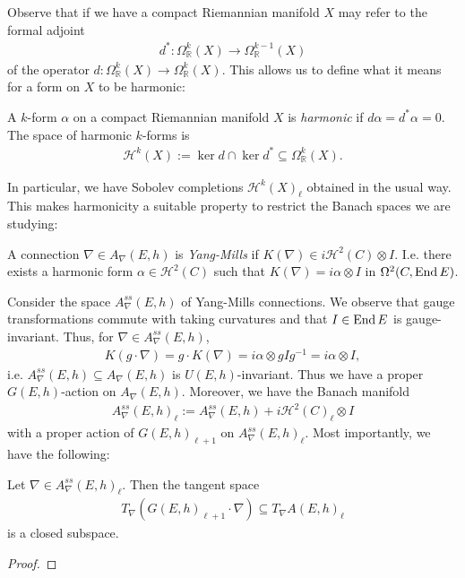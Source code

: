 \documentclass[12pt]{ociamthesis}  %
\begin{document}
Observe that if we have a compact Riemannian manifold $X$ may refer to the
formal adjoint 
\begin{align*}
  d^* : \Omega^k_{\mathbb{R}}(X)\to \Omega^{k-1}_{\mathbb{R}}(X)
\end{align*}
of the operator $d : \Omega^k_{\mathbb{R}}(X)\to\Omega^k_{\mathbb{R}}(X)$. This allows us to
define what it means for a form on $X$ to be harmonic:

\begin{definition}
  A $k$-form $\alpha$ on a compact Riemannian manifold $X$ is \emph{harmonic} if
  $d \alpha = d^* \alpha = 0$. The space of harmonic $k$-forms is
  \begin{align*}
    \mathcal H^k(X) := \ker d \cap \ker d^* \subseteq \Omega^k_{\mathbb{R}}(X).
  \end{align*}
\end{definition}

In particular, we have Sobolev completions $\mathcal H^k(X)_\ell$
obtained in the usual way. This makes harmonicity a suitable property to
restrict the Banach spaces we are studying:

\begin{definition}
  A connection $\nabla\in A_\nabla(E,h)$ is \emph{Yang-Mills} if
  $K(\nabla) \in i\mathcal H^2(C)\otimes I$. I.e. there exists a harmonic form
  $\alpha\in\mathcal H^2(C)$ such that $K(\nabla) = i\alpha\otimes I$ in
  $\Omega^2(C,\operatorname{End} E)$.
\end{definition}

Consider the space $A_\nabla^{ss}(E,h)$ of Yang-Mills connections.
We observe that gauge transformations commute with taking curvatures and
that $I\in\operatorname{End} E$ is gauge-invariant. Thus, for $\nabla\in A_\nabla^{ss}(E,h)$,
\begin{align*}
  K(g\cdot\nabla)
  = g\cdot K(\nabla)
  = i\alpha\otimes gIg^{-1}
  = i\alpha\otimes I,
\end{align*}
i.e. $A_\nabla^{ss}(E,h)\subseteq A_\nabla(E,h)$ is $U(E,h)$-invariant.
Thus we have a proper $G(E,h)$-action on $A_\nabla(E,h)$. Moreover,
we have the Banach manifold
\begin{align*}
  A^{ss}_{\nabla}(E,h)_\ell := A^{ss}_\nabla(E,h) + i\mathcal H^2(C)_\ell\otimes I
\end{align*}
with a proper action of $G(E,h)_{\ell+1}$ on $A_\nabla^{ss}(E,h)_\ell$.
Most importantly, we have the following:
\begin{lemma}
  Let $\nabla\in A^{ss}_\nabla(E,h)_{\ell}$. Then the tangent space
  \begin{align*}
    T_\nabla(G(E,h)_{\ell+1}\cdot\nabla) \subseteq T_\nabla A(E,h)_\ell
  \end{align*} 
  is a closed subspace.
  \begin{proof}
    \missingproof
  \end{proof}
\end{lemma}
\end{document}
